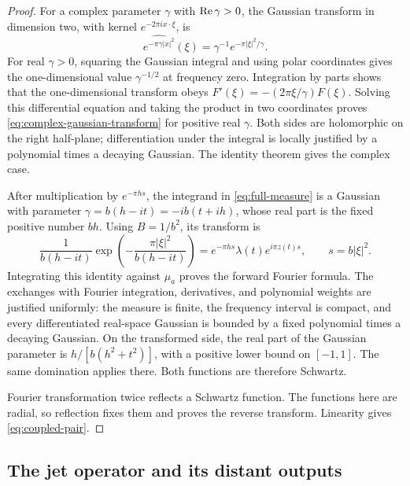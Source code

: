 \begin{proof}
For a complex parameter \(\gamma\) with \(\operatorname{Re}\gamma>0\), the Gaussian
transform in dimension two, with kernel \(e^{-2\pi i x\cdot\xi}\), is
\begin{equation}\label{eq:complex-gaussian-transform}
 \widehat{e^{-\pi\gamma|x|^2}}(\xi)
       =\gamma^{-1}e^{-\pi|\xi|^2/\gamma}.
\end{equation}
For real \(\gamma>0\), squaring the Gaussian integral and using polar
coordinates gives the one-dimensional value \(\gamma^{-1/2}\) at frequency
zero.  Integration by parts shows that the one-dimensional transform obeys
\(F'(\xi)=-(2\pi\xi/\gamma)F(\xi)\).  Solving this differential equation and
taking the product in two coordinates proves
\eqref{eq:complex-gaussian-transform} for positive real \(\gamma\).  Both
sides are holomorphic on the right half-plane; differentiation under the
integral is locally justified by a polynomial times a decaying Gaussian.
The identity theorem gives the complex case.

After multiplication by \(e^{-\pi hs}\), the integrand in
\eqref{eq:full-measure} is a Gaussian with parameter
\(\gamma=b(h-it)=-ib(t+ih)\), whose real part is the fixed positive number
\(bh\).  Using \(B=1/b^2\), its transform is
\[
 \frac1{b(h-it)}
    \exp\left(-\frac{\pi|\xi|^2}{b(h-it)}\right)
 =e^{-\pi hs}\lambda(t)e^{i\pi z(t)s},\qquad s=b|\xi|^2.
\]
Integrating this identity against \(\mu_a\) proves the forward Fourier
formula.  The exchanges with Fourier integration, derivatives, and polynomial
weights are justified uniformly: the measure is finite, the frequency
interval is compact, and every differentiated real-space Gaussian is bounded
by a fixed polynomial times a decaying Gaussian.  On the transformed side,
the real part of the Gaussian parameter is \(h/[b(h^2+t^2)]\), with a positive
lower bound on \([-1,1]\).  The same domination applies there.  Both functions
are therefore Schwartz.

Fourier transformation twice reflects a Schwartz function.  The functions
here are radial, so reflection fixes them and proves the reverse transform.
Linearity gives \eqref{eq:coupled-pair}.
\end{proof}

\subsection{The jet operator and its distant outputs}

